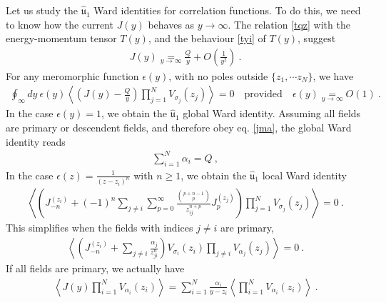 \documentclass[12pt, a4paper, notitlepage, twoside]{report}
\numberwithin{equation}{section}
\theoremstyle{break}
\begin{document}
Let us study the $\hat{\mathfrak{u}}_1$ Ward identities for correlation functions.
To do this, we need to know how the current $J(y)$ behaves as $y\to \infty$.
The relation \eqref{tqz} with the energy-momentum tensor $T(y)$, and the behaviour \eqref{tyi} of $T(y)$, suggest
\begin{align}
 \boxed{J(y) \underset{y\to \infty}{=} \frac{Q}{y} + O\left(\frac{1}{y^2}\right)}\ .
\label{jyi}
\end{align}
For any meromorphic function $\epsilon(y)$, with no poles outside $\{z_1,\cdots z_N\}$, we have 
\begin{align}
 \oint_\infty dy\ \epsilon(y) \left\langle \left(J(y)-\frac{Q}{y}\right)\prod_{j=1}^N V_{\sigma_j}(z_j)\right\rangle = 0   \quad \text{provided} \quad \epsilon(y) \underset{y\to\infty}{=} O(1)\ .
\end{align}
In the case $\epsilon(y)=1$, we obtain the $\hat{\mathfrak{u}}_1$ global Ward identity.
Assuming all fields are primary or descendent fields, and therefore obey eq. \eqref{jma}, the global Ward identity reads
\begin{align}
 \boxed{\sum_{i=1}^N \alpha_i = Q} \ ,
\label{saq}
\end{align}
In the case $\epsilon(z) = \frac{1}{(z-z_i)^{n}}$ with $n\geq 1$, we obtain the $\hat{\mathfrak{u}}_1$ local Ward identity
\begin{align}
\left\langle \left(J_{-n}^{(z_i)}+ (-1)^{n}\sum_{j\neq i}\sum_{p=0}^\infty \frac{\binom{p+n-1}{p}}{z_{ij}^{n+p}}  J_p^{(z_j)}\right)\prod_{j=1}^N V_{\sigma_j}(z_j) \right\rangle = 0\ .
\label{jnjp}
\end{align}
This simplifies when the fields with indices $j\neq i$ are primary, 
\begin{align}
 \left\langle \left(J_{-n}^{(z_i)}  + \sum_{j\neq i} \frac{\alpha_j}{z_{ji}^n}\right) V_{\sigma_i}(z_i)\prod_{j\neq i} V_{\alpha_j}(z_j)\right\rangle= 0\ .
\label{jnz}
\end{align}
If all fields are primary, we actually have 
\begin{align}
 \boxed{\left\langle J(y) \prod_{i=1}^N V_{\alpha_i}(z_i) \right\rangle = \sum_{i=1}^N \frac{\alpha_i}{y-z_i} \left\langle \prod_{i=1}^N V_{\alpha_i}(z_i) \right\rangle  }\ .
\label{jsa}
\end{align}
\end{document}
